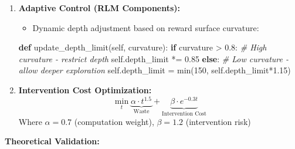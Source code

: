 \documentclass[
]{article}
\newenvironment{Shaded}{}{}
\newcommand{\BuiltInTok}[1]{\textcolor[rgb]{0.00,0.50,0.00}{#1}}
\newcommand{\CommentTok}[1]{\textcolor[rgb]{0.38,0.63,0.69}{\textit{#1}}}
\newcommand{\ControlFlowTok}[1]{\textcolor[rgb]{0.00,0.44,0.13}{\textbf{#1}}}
\newcommand{\DecValTok}[1]{\textcolor[rgb]{0.25,0.63,0.44}{#1}}
\newcommand{\FloatTok}[1]{\textcolor[rgb]{0.25,0.63,0.44}{#1}}
\newcommand{\KeywordTok}[1]{\textcolor[rgb]{0.00,0.44,0.13}{\textbf{#1}}}
\newcommand{\NormalTok}[1]{#1}
\newcommand{\OperatorTok}[1]{\textcolor[rgb]{0.40,0.40,0.40}{#1}}
\newcommand{\VariableTok}[1]{\textcolor[rgb]{0.10,0.09,0.49}{#1}}
\providecommand{\tightlist}{%
  \setlength{\itemsep}{0pt}\setlength{\parskip}{0pt}}
\begin{document}
\begin{enumerate}
\def\labelenumi{\arabic{enumi}.}
\setcounter{enumi}{1}
\tightlist
\item
  \textbf{Adaptive Control (RLM Components):}

  \begin{itemize}
  \tightlist
  \item
    Dynamic depth adjustment based on reward surface curvature:
  \end{itemize}

\begin{Shaded}
\begin{Highlighting}[]
\KeywordTok{def}\NormalTok{ update\_depth\_limit(}\VariableTok{self}\NormalTok{, curvature):}
    \ControlFlowTok{if}\NormalTok{ curvature }\OperatorTok{\textgreater{}} \FloatTok{0.8}\NormalTok{:  }\CommentTok{\# High curvature {-} restrict depth}
        \VariableTok{self}\NormalTok{.depth\_limit }\OperatorTok{*=} \FloatTok{0.85}
    \ControlFlowTok{else}\NormalTok{:  }\CommentTok{\# Low curvature {-} allow deeper exploration}
        \VariableTok{self}\NormalTok{.depth\_limit }\OperatorTok{=} \BuiltInTok{min}\NormalTok{(}\DecValTok{150}\NormalTok{, }\VariableTok{self}\NormalTok{.depth\_limit}\OperatorTok{*}\FloatTok{1.15}\NormalTok{)}
\end{Highlighting}
\end{Shaded}
\item
  \textbf{Intervention Cost Optimization:}
  \[\min_{t} \underbrace{\alpha \cdot t^{1.5}}_{\text{Waste}} + \underbrace{\beta \cdot e^{-0.3t}}_{\text{Intervention Cost}}\]
  Where \(\alpha =0.7\) (computation weight), \(\beta =1.2\)
  (intervention risk)
\end{enumerate}

\textbf{Theoretical Validation:}
\end{document}
